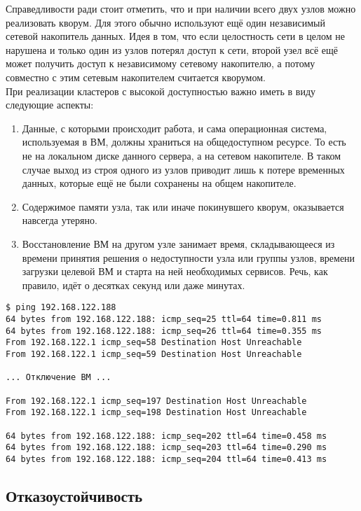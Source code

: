 \documentclass[14pt, a4paper]{article}
\begin{document}
Справедливости ради стоит отметить, что и при наличии всего двух узлов можно реализовать кворум.
Для этого обычно используют ещё один независимый сетевой накопитель данных. Идея в том, что
если целостность сети в целом не нарушена и только один из узлов потерял доступ к сети, второй
узел всё ещё может получить доступ к независимому сетевому накопителю, а потому совместно с
этим сетевым накопителем считается кворумом.\\

При реализации кластеров с высокой доступностью важно иметь в виду следующие аспекты:
\begin{enumerate}
    \item Данные, с которыми происходит работа, и сама операционная система, используемая в ВМ,
    должны храниться на общедоступном ресурсе. То есть не на локальном диске данного
    сервера, а на сетевом накопителе. В таком случае выход из строя одного из узлов приводит
    лишь к потере временных данных, которые ещё не были сохранены на общем накопителе.
    \item Содержимое памяти узла, так или иначе покинувшего кворум, оказывается навсегда утеряно.
    \item Восстановление ВМ на другом узле занимает время, складывающееся из времени принятия
    решения о недоступности узла или группы узлов, времени загрузки целевой ВМ и старта на
    ней необходимых сервисов. Речь, как правило, идёт о десятках секунд или даже минутах.
\end{enumerate}

\begin{lstlisting}
$ ping 192.168.122.188
64 bytes from 192.168.122.188: icmp_seq=25 ttl=64 time=0.811 ms
64 bytes from 192.168.122.188: icmp_seq=26 ttl=64 time=0.355 ms
From 192.168.122.1 icmp_seq=58 Destination Host Unreachable
From 192.168.122.1 icmp_seq=59 Destination Host Unreachable

... Отключение ВМ ...

From 192.168.122.1 icmp_seq=197 Destination Host Unreachable
From 192.168.122.1 icmp_seq=198 Destination Host Unreachable

64 bytes from 192.168.122.188: icmp_seq=202 ttl=64 time=0.458 ms
64 bytes from 192.168.122.188: icmp_seq=203 ttl=64 time=0.290 ms
64 bytes from 192.168.122.188: icmp_seq=204 ttl=64 time=0.413 ms
\end{lstlisting}

\subsection*{Отказоустойчивость} 
\end{document}
